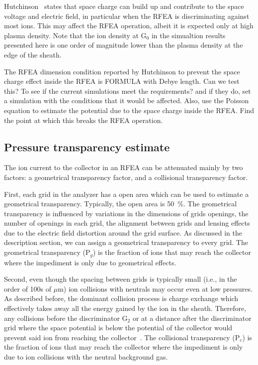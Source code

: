 Hutchinson~\cite{Hutchinson1987} states that space charge can build up and contribute to the space voltage and electric field, in particular when the RFEA is discriminating against most ions. This may affect the RFEA operation, albeit it is expected only at high plasma density. Note that the ion density at G$_0$ in the simualtion results presented here is one order of magnitude lower than the plasma density at the edge of the sheath. 

The RFEA dimension condition reported by Hutchinson to prevent the space charge effect inside the RFEA is 
FORMULA with Debye length. 
Can we test this? To see if the current simulations meet the requirements? and if they do, set a simulation with the conditions that it would be affected. Also, use the Poisson equation to estimate the potential due to the space charge inside the RFEA. Find the point at which this breaks the RFEA operation. 





\subsection{Pressure transparency estimate}
The ion current to the collector in an RFEA can be attenuated mainly by two factors: a geometrical transparency factor, and a collisional transparency factor.  

First, each grid in the analyzer has a open area which can be used to estimate a geometrical transparency. Typically, the open area is 50~\%. The geometrical transparency is influenced by variations in the dimensions of grids openings, the number of openings in each grid, the alignment between grids and lensing effects due to the electric field distortion around the grid surface. As discussed in the description section, we can assign a geometrical transparency to every grid. The geometrical transparency (P$_g$) is the fraction of ions that may reach the collector where the impediment is only due to geometrical effects.  

Second, even though the spacing between grids is typically small (i.e., in the order of 100s of $\mu$m) ion collisions with neutrals may occur even at low pressures. As described before, the dominant collision process is charge exchange which effectively takes away all the energy gained by the ion in the sheath. Therefore, any collisions before the discriminator G$_2$ or at a distance after the discriminator grid where the space potential is below the potential of the collector would prevent said ion from reaching the collector~\cite{Baloniak2010}. The collisional transparency (P$_c$) is the fraction of ions that may reach the collector where the impediment is only due to ion collisions with the neutral background gas. 

